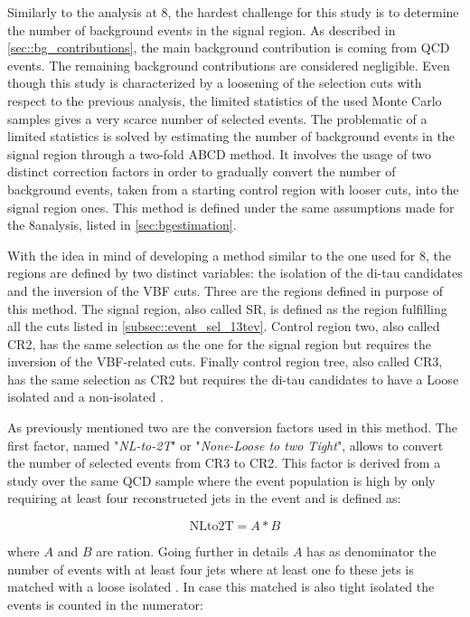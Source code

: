 Similarly to the analysis at 8\tev, the hardest challenge for this study is to determine the number of background events in the signal region. As described in \autoref{sec::bg_contributions}, the main background contribution is coming from QCD events. The remaining background contributions are considered negligible. Even though this study is characterized by a loosening of the selection cuts with respect to the previous analysis, the limited statistics of the used Monte Carlo samples gives a very scarce number of selected events. The problematic of a limited statistics is solved by estimating the number of background events in the signal region through a two-fold ABCD method. It involves the usage of two distinct correction factors in order to gradually convert the number of background events, taken from a starting control region with looser cuts, into the signal region ones. This method is defined under the same assumptions made for the 8\tev analysis, listed in \autoref{sec:bgestimation}.

With the idea in mind of developing a method similar to the one used for 8\tev, the regions are defined by two distinct variables: the isolation of the di-tau candidates and the inversion of the VBF cuts. Three are the regions defined in purpose of this method. The signal region, also called SR, is defined as the region fulfilling all the cuts listed in \autoref{subsec::event_sel_13tev}. Control region two, also called CR2, has the same selection as the one for the signal region but requires the inversion of the VBF-related cuts. Finally control region tree, also called CR3, has the same selection as CR2 but requires the di-tau candidates to have a Loose isolated and a non-isolated \hadtau.

As previously mentioned two are the conversion factors used in this method. The first factor, named "\textit{NL-to-2T}" or "\textit{None-Loose to two Tight}", allows to convert the number of selected events from CR3 to CR2. This factor is derived from a study over the same QCD sample where the event population is high by only requiring at least four reconstructed jets in the event and is defined as:

\begin{equation}
\text{NLto2T} = A * B
\end{equation}

where $A$ and $B$ are ration. Going further in details $A$ has as denominator the number of events with at least four jets where at least one fo these jets is matched with a loose isolated \hadtau. In case this matched \hadtau is also tight isolated the events is counted in the numerator:

